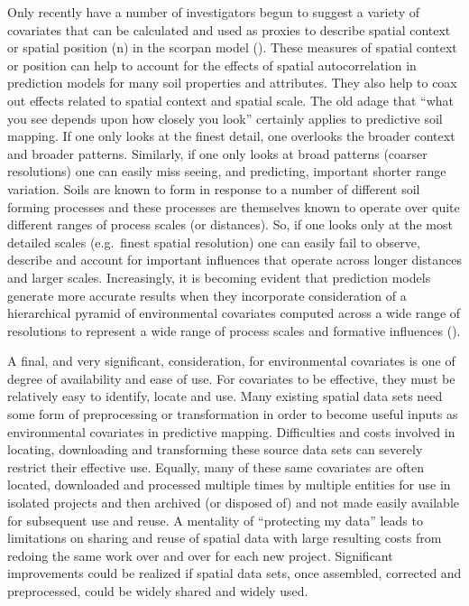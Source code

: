 \documentclass[graybox,natbib,nospthms,UStrade]{svmono}
\begin{document}
Only recently have a number of investigators begun to suggest a variety
of covariates that can be calculated and used as proxies to describe
spatial context or spatial position (n) in the scorpan model (\citet{BehrensSR2018}). These
measures of spatial context or position can help to account for the effects
of spatial autocorrelation in prediction models for many soil properties
and attributes. They also help to coax out effects related to spatial
context and spatial scale. The old adage that ``what you see depends upon
how closely you look'' certainly applies to predictive soil mapping. If
one only looks at the finest detail, one overlooks the broader context
and broader patterns. Similarly, if one only looks at broad patterns
(coarser resolutions) one can easily miss seeing, and predicting,
important shorter range variation. Soils are known to form in response
to a number of different soil forming processes and these processes are
themselves known to operate over quite different ranges of process
scales (or distances). So, if one looks only at the most detailed scales
(e.g.~finest spatial resolution) one can easily fail to observe,
describe and account for important influences that operate across longer
distances and larger scales. Increasingly, it is becoming evident that
prediction models generate more accurate results when they incorporate
consideration of a hierarchical pyramid of environmental covariates
computed across a wide range of resolutions to represent a wide range of
process scales and formative influences (\citet{BehrensSR2018}).

A final, and very significant, consideration, for environmental
covariates is one of degree of availability and ease of use. For
covariates to be effective, they must be relatively easy to identify,
locate and use. Many existing spatial data sets need some form of
preprocessing or transformation in order to become useful inputs as
environmental covariates in predictive mapping. Difficulties and costs
involved in locating, downloading and transforming these source data
sets can severely restrict their effective use. Equally, many of these
same covariates are often located, downloaded and processed multiple
times by multiple entities for use in isolated projects and then archived
(or disposed of) and not made easily available for subsequent use and
reuse. A mentality of ``protecting my data'' leads to limitations on
sharing and reuse of spatial data with large resulting costs from
redoing the same work over and over for each new project. Significant
improvements could be realized if spatial data sets, once assembled,
corrected and preprocessed, could be widely shared and widely used.
\end{document}
